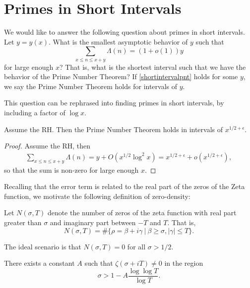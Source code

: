 \section{Primes in Short Intervals}
We would like to answer the following question about primes in short intervals. Let $y=y(x)$. What is the smallest asymptotic behavior of $y$
such that \begin{equation}\label{shortintervalpnt}
\sum_{x\leq n \leq x+y} \Lambda(n) = (1+o(1)) y
\end{equation}
for large enough $x$? That is, what is the shortest interval such that we have the behavior of the Prime Number Theorem? If \ref{shortintervalpnt} holds for some $y$,
we say the Prime Number Theorem holds for intervals of $y$.
\begin{remark}
    This question can be rephrased into finding primes in short intervals, by including a factor of $\log x$. 
\end{remark} 
\begin{proposition}
    Assume the RH. Then the Prime Number Theorem holds in intervals of $x^{1/2+\epsilon}$.
\end{proposition}
\begin{proof}
    Assume the RH, then
    \begin{align*}
        \sum_{x\leq n \leq x+y} \Lambda(n)=
        y+O(x^{1/2}\log^2 x) = x^{1/2+\epsilon} + o(x^{1/2+\epsilon}),
    \end{align*}
    so that the sum is non-zero for large enough $x$.
\end{proof}
Recalling that the error term is related to the real part of the zeros of the Zeta function, we motivate the following definition of zero-density:
\begin{definition}
    Let $N(\sigma, T)$ denote the number of zeros of the zeta function with real part greater than $\sigma$ and imaginary part between $-T$ and $T$. That is,\[
        N(\sigma,T) = \# \{\rho = \beta + i\gamma \ | \ \beta \geq\sigma, |\gamma|\leq T\}.
    \]
\end{definition}
\begin{remark}
    The ideal scenario is that $N(\sigma,T)=0$ for all $\sigma> 1/2$. 
\end{remark}
\begin{theorem}[Chudakov] 
    There exists a constant $A$ such that $\zeta(\sigma+iT)\neq 0$ in the region \begin{equation*}
        \sigma > 1 - A\frac{\log \log T}{\log T}.
    \end{equation*}
\end{theorem}
